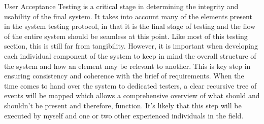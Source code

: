\documentclass[11pt, english]{article}
\begin{document}
	User Acceptance Testing is a critical stage in determining the integrity and usability of the final system. It takes into account many of the elements present in the system testing protocol, in that it is the final stage of testing and the flow of the entire system should be seamless at this point. Like most of this testing section, this is still far from tangibility. However, it is important when developing each individual component of the system to keep in mind the overall structure of the system and how an element may be relevant to another. This is key step in ensuring consistency and coherence with the brief of requirements. When the time comes to hand over the system to dedicated testers, a clear recursive tree of events will be mapped which allows a comprehensive overview of what should and shouldn't be present and therefore, function. It's likely that this step will be executed by myself and one or two other experienced individuals in the field.
	
\end{document}
